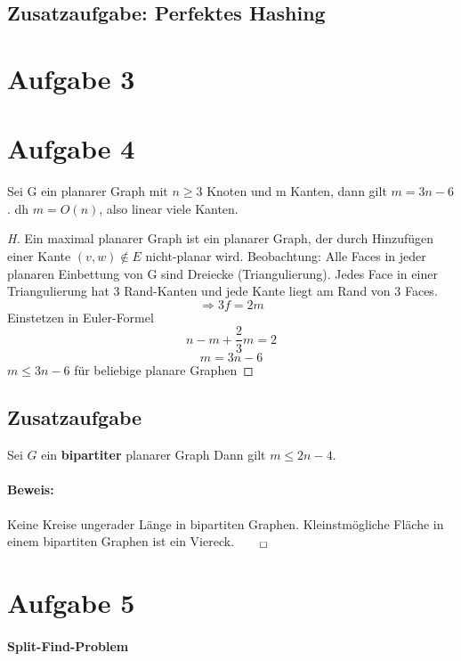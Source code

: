 \documentclass[10pt,a4paper]{article}
\begin{document}
\subsection*{Zusatzaufgabe: Perfektes Hashing}

\section*{Aufgabe 3}


\section*{Aufgabe 4}
	Sei G ein planarer Graph mit $ n \geq 3 $ Knoten und m Kanten, dann gilt $ m = 3n-6 $. dh $ m=O(n) $, also linear viele Kanten.
	\begin{proof}[H]
		Ein maximal planarer Graph ist ein planarer Graph, der durch Hinzufügen einer Kante $ (v,w) \notin E $ nicht-planar wird. Beobachtung: Alle Faces in jeder planaren Einbettung von G sind Dreiecke (Triangulierung). Jedes Face in einer Triangulierung hat 3 Rand-Kanten und jede Kante liegt am Rand von 3 Faces. 
		$$\Rightarrow 3f = 2m $$
		Einstetzen in Euler-Formel
		$$ n - m + \frac{2}{3}m = 2$$
		$$ m = 3n-6$$
		$ m \leq 3n-6 $ für beliebige planare Graphen
	\end{proof}

\subsection*{Zusatzaufgabe}
Sei $G$ ein \textbf{bipartiter} planarer Graph Dann gilt $ m \leq 2n-4 $. 

\paragraph{Beweis:} Keine Kreise ungerader Länge in bipartiten Graphen. Kleinstmögliche Fläche in einem bipartiten Graphen ist ein Viereck.$_{\qed}$


\section*{Aufgabe 5}
\paragraph{Split-Find-Problem}
\end{document}
